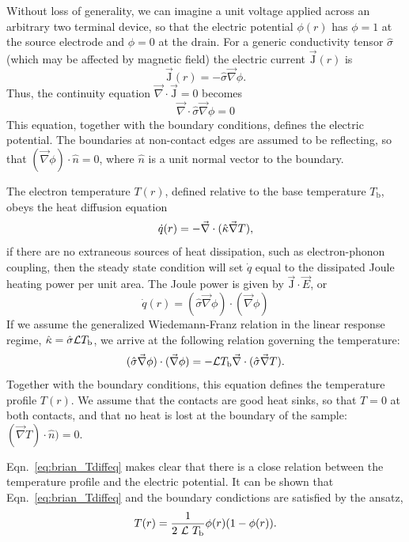 Without loss of generality, we can imagine a unit voltage applied across an arbitrary two terminal device, so that the electric potential $\phi (r)$ has $\phi = 1$ at the source electrode and $\phi = 0$ at the drain. For a generic conductivity tensor $\hat\sigma$ (which may be affected by magnetic field) the electric current $\vec{\mathrm{J}}(r)$ is
\begin{equation}
\vec{\mathrm{J}}(r) = -\hat\sigma\vec\nabla\phi .
\end{equation}
Thus, the continuity equation $\vec\nabla\cdot\vec{\mathrm{J}}=0$ becomes
\begin{equation}
\vec\nabla\cdot\hat\sigma\vec\nabla\phi=0
\end{equation}
This equation, together with the boundary conditions, defines the electric potential. The boundaries at non-contact edges are assumed to be reflecting, so that $(\vec\nabla\phi)\cdot\hat{n}=0$, where $\hat{n}$ is a unit normal vector to the boundary.

The electron temperature $T(r)$, defined relative to the base temperature $T_\mathrm{b}$, obeys the heat diffusion equation
\begin{equation}
\dot{q}(r) = -\vec\nabla\cdot(\hat{\mathrm{\kappa}}\vec\nabla T),
\end{equation}
if there are no extraneous sources of heat dissipation, such as electron-phonon coupling, then the steady state condition will set $\dot{q}$  equal to the dissipated Joule heating power per unit area. The Joule power is given by $\vec{\mathrm{J}}\cdot\vec{E}$, or
\begin{equation}
\dot{q}(r) = (\hat\sigma\vec\nabla\phi)\cdot(\vec\nabla\phi)
\label{eq:brian_qdot}
\end{equation}
If we assume the generalized Wiedemann-Franz relation in the linear response regime, $\hat{\mathrm{\kappa}} = \hat\sigma\mathcal{L} T_\mathrm{b}$, we arrive at the following relation governing the temperature:
\begin{equation}\label{eq:brian_Tdiffeq}
(\hat\sigma\vec\nabla\phi)\cdot(\vec\nabla\phi) = -\mathcal{L} T_\mathrm{b}\vec\nabla\cdot(\hat\sigma\vec\nabla T).
\end{equation}
Together with the boundary conditions, this equation defines the temperature profile $T(r)$. We assume that the contacts are good heat sinks, so that $T = 0$ at both contacts,
and that no heat is lost at the boundary of the sample: $(\vec\nabla T)\cdot\hat{n}) = 0$.

Eqn.~\ref{eq:brian_Tdiffeq} makes clear that there is a close relation between the temperature profile and the electric potential. It can be shown that Eqn.~\ref{eq:brian_Tdiffeq} and the boundary condictions are satisfied by the ansatz,
\begin{equation}\label{eq:brian_Tprofile}
T(r)=\frac{1}{2~\mathcal{L}~T_\mathrm{b}}\phi(r)(1-\phi(r)).
\end{equation}

